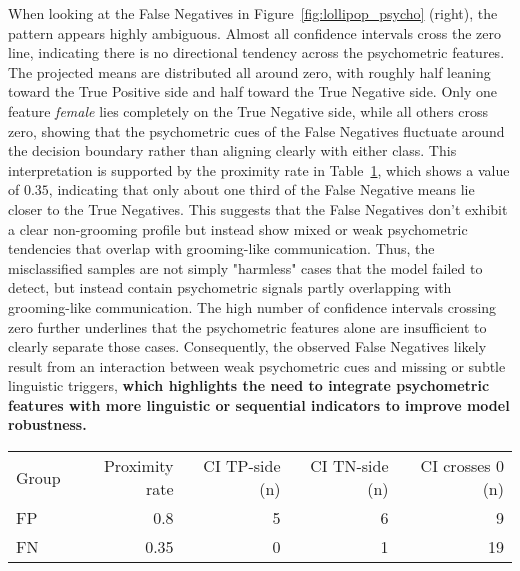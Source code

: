 When looking at the False Negatives in Figure~\ref{fig:lollipop_psycho} (right), the pattern appears highly ambiguous. Almost all confidence intervals cross the zero line, indicating there is no directional tendency across the psychometric features. The projected means are distributed all around zero, with roughly half leaning toward the True Positive side and half toward the True Negative side. Only one feature \textit{female} lies completely on the True Negative side, while all others cross zero, showing that the psychometric cues of the False Negatives fluctuate around the decision boundary rather than aligning clearly with either class. This interpretation is supported by the proximity rate in Table~\ref{tab:proximity_key_results_psycho}, which shows a value of $0.35$, indicating that only about one third of the False Negative means lie closer to the True Negatives. This suggests that the False Negatives don't exhibit a clear non-grooming profile but instead show mixed or weak psychometric tendencies that overlap with grooming-like communication. Thus, the misclassified samples are not simply "harmless" cases that the model failed to detect, but instead contain psychometric signals partly overlapping with grooming-like communication. The high number of confidence intervals crossing zero further underlines that the psychometric features alone are insufficient to clearly separate those cases. Consequently, the observed False Negatives likely result from an interaction between weak psychometric cues and missing or subtle linguistic triggers, \textbf{which highlights the need to integrate psychometric features with more linguistic or sequential indicators to improve model robustness.}

\begin{table}[H]
\centering
{}
\label{tab:proximity_key_results_psycho}
\begin{tabular}{@{}lrrrr@{}}
\toprule
Group & Proximity rate & CI TP-side (n) & CI TN-side (n) & CI crosses 0 (n) \\
\cmidrule(lr){2-5}
FP & 0.8 & 5 & 6 & 9 \\
FN & 0.35 & 0 & 1 & 19 \\
\bottomrule
\end{tabular}
\end{table}










